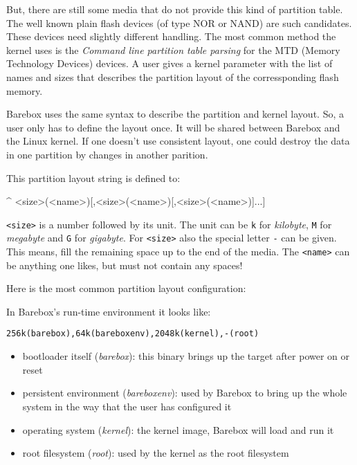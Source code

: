 But, there are still some media that do not provide this kind of partition table.
The well known plain flash devices (of type NOR or NAND) are such candidates.
These devices need slightly different handling. The most common method the
kernel uses is the \textit{Command line partition table parsing} for the MTD
(Memory Technology Devices) devices. A user gives a kernel parameter with the
list of names and sizes that describes the partition layout of the
corressponding flash memory.

%
%

Barebox uses the same syntax to describe the partition and kernel layout. So,
a user only has to define the layout once. It will be shared between Barebox
and the Linux kernel. If one doesn't use consistent layout, one could destroy
the data in one partition by changes in another parition.

This partition layout string is defined to:

\begin{ptxshell}[escapechar=|]{^}
<size>(<name>)[,<size>(<name>)[,<size>(<name>)]...]
\end{ptxshell}

\texttt{<size>} is a number followed by its unit. The unit can be \texttt{k} for
\textit{kilobyte}, \texttt{M} for \textit{megabyte} and \texttt{G} for
\textit{gigabyte}. For \texttt{<size>} also the special letter \texttt{-}
can be given. This means, fill the remaining space up to the end of the media. The
\texttt{<name>} can be anything one likes, but must not contain any spaces!

Here is the most common partition layout configuration:

In Barebox's run-time environment it looks like:

\texttt{256k(barebox),64k(bareboxenv),2048k(kernel),-(root)}

\begin{itemize}
 \item bootloader itself (\textit{barebox}): this binary brings up the target
  after power on or reset
 \item persistent environment (\textit{bareboxenv}): used by Barebox to bring up
  the whole system in the way that the user has configured it
 \item operating system (\textit{kernel}): the kernel image, Barebox will load
  and run it
 \item root filesystem (\textit{root}): used by the kernel as the root
  filesystem
\end{itemize}

